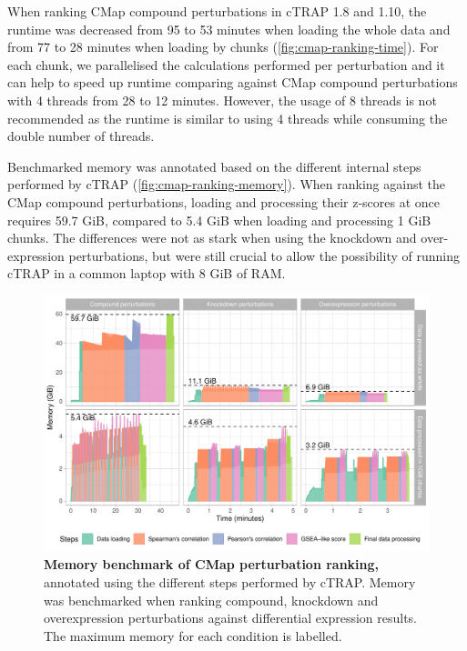 When ranking CMap compound perturbations in cTRAP 1.8 and 1.10, the runtime was decreased from 95 to 53 minutes when loading the whole data and from 77 to 28 minutes when loading by chunks (\autoref{fig:cmap-ranking-time}). For each chunk, we parallelised the calculations performed per perturbation and it can help to speed up runtime comparing against CMap compound perturbations with 4 threads from 28 to 12 minutes. However, the usage of 8 threads is not recommended as the runtime is similar to using 4 threads while consuming the double number of threads.

Benchmarked memory was annotated based on the different internal steps performed by cTRAP (\autoref{fig:cmap-ranking-memory}). When ranking against the CMap compound perturbations, loading and processing their z-scores at once requires 59.7 GiB, compared to 5.4 GiB when loading and processing 1 GiB chunks. The differences were not as stark when using the knockdown and over-expression perturbations, but were still crucial to allow the possibility of running cTRAP in a common laptop with 8 GiB of RAM. %

\begin{figure}[!ht]
  \includegraphics[width=\textwidth]{images/ctrap/ranking-memory}
  \centering
  \caption[Memory benchmark of CMap perturbation ranking]{\textbf{Memory benchmark of CMap perturbation ranking,} annotated using the different steps performed by cTRAP. Memory was benchmarked when ranking compound, knockdown and overexpression perturbations against differential expression results. The maximum memory for each condition is labelled.}
  \label{fig:cmap-ranking-memory}
\end{figure}

